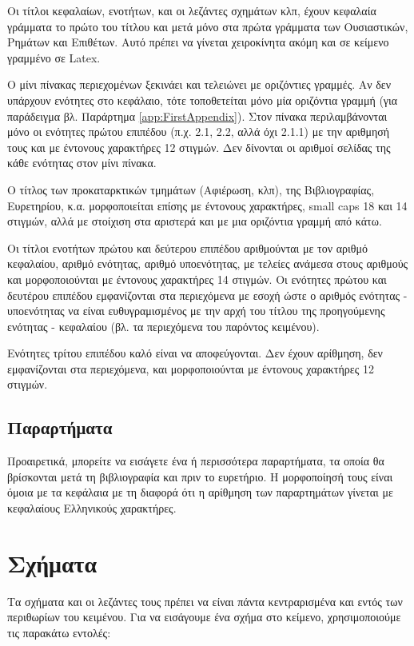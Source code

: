 Οι τίτλοι κεφαλαίων, ενοτήτων, και οι λεζάντες σχημάτων κλπ, έχουν κεφαλαία γράμματα το πρώτο του τίτλου και μετά μόνο στα πρώτα γράμματα των Ουσιαστικών, Ρημάτων και Επιθέτων.
Αυτό πρέπει να γίνεται χειροκίνητα ακόμη και σε κείμενο γραμμένο σε Latex.

Ο μίνι πίνακας περιεχομένων ξεκινάει και τελειώνει με οριζόντιες γραμμές.
Αν δεν υπάρχουν ενότητες στο κεφάλαιο, τότε τοποθετείται μόνο μία οριζόντια γραμμή (για παράδειγμα βλ. Παράρτημα \ref{app:FirstAppendix}).
Στον πίνακα περιλαμβάνονται μόνο οι ενότητες πρώτου επιπέδου (π.χ. 2.1, 2.2, αλλά όχι 2.1.1) με την αριθμησή τους και με έντονους χαρακτήρες 12 στιγμών.
Δεν δίνονται οι αριθμοί σελίδας της κάθε ενότητας στον μίνι πίνακα.

Ο τίτλος των προκαταρκτικών τμημάτων (Αφιέρωση, κλπ), της Βιβλιογραφίας, Ευρετηρίου, κ.α. μορφοποιείται επίσης με έντονους χαρακτήρες, small caps 18 και 14 στιγμών,  αλλά με στοίχιση στα αριστερά και με μια οριζόντια γραμμή από κάτω.


Οι τίτλοι ενοτήτων πρώτου και δεύτερου επιπέδου αριθμούνται με τον αριθμό κεφαλαίου, αριθμό ενότητας, αριθμό υποενότητας, με τελείες ανάμεσα στους αριθμούς και μορφοποιούνται με έντονους χαρακτήρες 14 στιγμών.
Οι ενότητες πρώτου και δευτέρου επιπέδου εμφανίζονται στα περιεχόμενα με εσοχή ώστε ο αριθμός ενότητας - υποενότητας να είναι ευθυγραμισμένος με την αρχή του τίτλου της προηγούμενης ενότητας - κεφαλαίου (βλ. τα περιεχόμενα του παρόντος κειμένου).

Ενότητες τρίτου επιπέδου καλό είναι να αποφεύγονται. %
Δεν έχουν αρίθμηση, δεν εμφανίζονται στα περιεχόμενα, και μορφοποιούνται με έντονους χαρακτήρες 12 στιγμών.


\subsection{Παραρτήματα}
\label{subsec:Appendices}
Προαιρετικά, μπορείτε να εισάγετε ένα ή περισσότερα παραρτήματα, τα οποία 
θα βρίσκονται μετά τη βιβλιογραφία και πριν το ευρετήριο.
Η μορφοποίησή τους είναι όμοια με τα κεφάλαια με τη διαφορά ότι η αρίθμηση των παραρτημάτων 
γίνεται με κεφαλαίους Ελληνικούς χαρακτήρες.


\section{Σχήματα}
\label{sec:Figures}
Τα σχήματα και οι λεζάντες τους πρέπει να είναι πάντα κεντραρισμένα και εντός 
των περιθωρίων του κειμένου. Για να εισάγουμε ένα σχήμα στο κείμενο, 
χρησιμοποιούμε τις παρακάτω εντολές:

